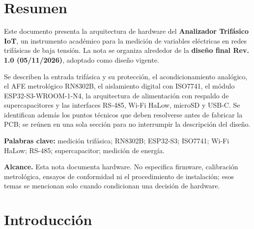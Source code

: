 \documentclass[11pt,a4paper]{article}
\begin{document}
\setcounter{page}{1}

\section*{Resumen}

Este documento presenta la arquitectura de hardware del \textbf{Analizador
Trifásico IoT}, un instrumento académico para la medición de variables
eléctricas en redes trifásicas de baja tensión. La nota se organiza alrededor
de la \textbf{diseño final Rev. 1.0 (05/11/2026)}, adoptado como diseño
vigente.

Se describen la entrada trifásica y su protección, el acondicionamiento
analógico, el AFE metrológico RN8302B, el aislamiento digital con ISO7741, el
módulo ESP32-S3-WROOM-1-N4, la arquitectura de alimentación con respaldo de
supercapacitores y las interfaces RS-485, Wi-Fi HaLow, microSD y USB-C. Se
identifican además los puntos técnicos que deben resolverse antes de fabricar
la PCB; se reúnen en una sola sección para no interrumpir la descripción del
diseño.

\vspace{0.4em}
\noindent\textbf{Palabras clave:} medición trifásica; RN8302B; ESP32-S3;
ISO7741; Wi-Fi HaLow; RS-485; supercapacitor; medición de energía.

\vspace{0.6em}
\noindent\textbf{Alcance.} Esta nota documenta hardware. No especifica
firmware, calibración metrológica, ensayos de conformidad ni el procedimiento
de instalación; esos temas se mencionan solo cuando condicionan una decisión de
hardware.

\newpage
\tableofcontents
\newpage
\listoffigures
\vspace{0.5em}
\listoftables

\newpage
{}
\setcounter{page}{1}

\section{Introducción}
\end{document}
